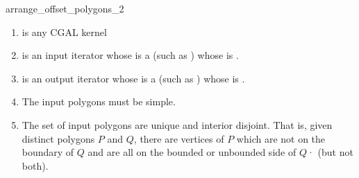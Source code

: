 \begin{ccRefFunction}{arrange_offset_polygons_2}
\begin{enumerate} 
   \item    {} is any CGAL kernel
   \item    {} is an input iterator whose  is a 
            (such as ) whose  is .
   \item    {} is an output iterator whose  is a 
            (such as ) whose  is .
   \item    The input polygons must be simple.
   \item    The set of input polygons are unique and interior disjoint. That is, given distinct polygons
            $P$ and $Q$, there are vertices of $P$ which are not on the boundary of $Q$ and are all on the
            bounded or unbounded side of $Q$· (but not both). 
\end{enumerate}


\ccSeeAlso
{}\\
 \\

\end{ccRefFunction}


